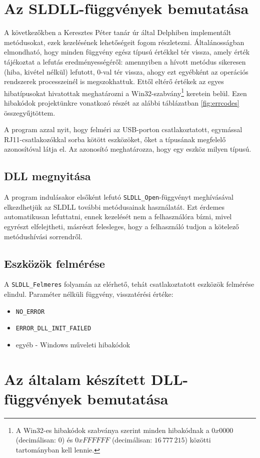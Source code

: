 \documentclass[tocnopagenum]{thesis-ekf}
\theoremstyle{definition}
\theoremstyle{remark}
\begin{document}
	\section{Az SLDLL-függvények bemutatása}
	A következőkben a Keresztes Péter tanár úr által Delphiben implementált metódusokat, ezek kezelésének lehetőségeit fogom részletezni.
	Általánosságban elmondható, hogy minden függvény egész típusú értékkel tér vissza, amely érték tájékoztat a lefutás eredményességéről: amennyiben a hívott metódus sikeresen (hiba, kivétel nélkül) lefutott, 0-val tér vissza, ahogy ezt egyébként az operációs rendszerek processzeinél is megszokhattuk. Ettől eltérő értékek az egyes hibatípusokat hivatottak meghatározni a Win32-szabvány\footnote{A Win32-es hibakódok szabványa szerint minden hibakódnak a $0x0000$ (decimálisan: 0) és $0xFFFFFF$ (decimálisan: $16\,777\,215$) közötti tartományban kell lennie.} keretein belül. Ezen hibakódok projektünkre vonatkozó részét az alábbi táblázatban \ref{fig:errcodes} összegyűjtöttem. \cite{errcodes}
	
	A program azzal nyit, hogy felméri az USB-porton csatlakoztatott, egymással RJ11-csatlakozókkal sorba kötött eszközöket, őket a típusának megfelelő azonosítóval látja el. Az azonosító meghatározza, hogy egy eszköz milyen típusú. 
	
	\subsection{DLL megnyitása}
	A program indulásakor elsőként lefutó \verb*|SLDLL_Open|-függvényt meghívásával elkezdhetjük az SLDLL további metódusainak használatát. Ezt érdemes automatikusan lefuttatni, ennek kezelését nem a felhasználóra bízni, mivel egyrészt elfelejtheti, másrészt felesleges, hogy a felhasználó tudjon a kötelező metódushívási sorrendről. 
	\subsection{Eszközök felmérése}
	A \verb*|SLDLL_Felmeres| folyamán az elérhető, tehát csatlakoztatott eszközök felmérése elindul. Paraméter nélküli függvény, visszatérési értéke:
	\begin{itemize}
		\item \verb*|NO_ERROR|
		\item \verb*|ERROR_DLL_INIT_FAILED|
		\item egyéb - Windows műveleti hibakódok
	\end{itemize}
	\section{Az általam készített DLL-függvények bemutatása}
\end{document}

